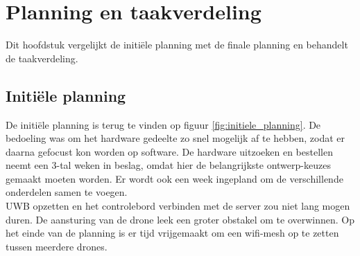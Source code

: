 \chapter{Planning en taakverdeling}
Dit hoofdstuk vergelijkt de initiële planning met de finale planning en behandelt de taakverdeling.

\section{Initi\"ele planning} \label{sec:initiele_planning}
De initi\"ele planning is terug te vinden op figuur \ref{fig:initiele_planning}. De bedoeling was om het hardware gedeelte zo snel mogelijk af te hebben, zodat er daarna gefocust kon worden op software. De hardware uitzoeken en bestellen neemt een 3-tal weken in beslag, omdat hier de belangrijkste ontwerp-keuzes gemaakt moeten worden. Er wordt ook een week ingepland om de verschillende onderdelen samen te voegen.\\

UWB opzetten en het controlebord verbinden met de server zou niet lang mogen duren. De aansturing van de drone leek een groter obstakel om te overwinnen. Op het einde van de planning is er tijd vrijgemaakt om een wifi-mesh op te zetten tussen meerdere drones.\\

